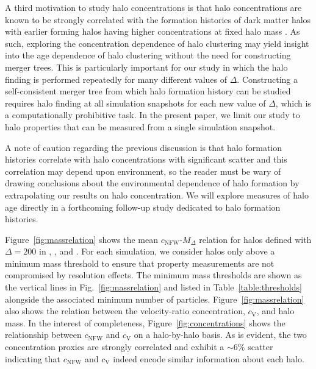 \documentclass[usenatbib,fleqn]{mnras}
\begin{document}
A third motivation to study halo concentrations is that halo concentrations are known to be strongly correlated with the formation histories of dark matter halos with earlier forming halos having higher concentrations at fixed halo mass \citep{wechsler_etal02, zhao_etal03, wechsler_etal06, zhao_etal09}. 
As such, exploring the concentration dependence of halo clustering may yield insight into the age dependence of halo clustering without the need for constructing merger
trees. This is particularly important for our study in which the halo finding is performed repeatedly for many different values of $\Delta$. Constructing a self-consistent merger tree from which halo formation history can be 
studied requires halo finding at all simulation snapshots for each new value of $\Delta$, which is a computationally prohibitive task. In the present paper, we limit our study to halo properties that can be measured from a single simulation 
snapshot. 

A note of caution regarding the previous discussion is that halo formation histories correlate with halo concentrations with significant scatter and this correlation may 
depend upon environment, so the reader must be wary of drawing conclusions about the environmental dependence of halo formation by extrapolating our results on halo concentration. We will explore measures of halo age directly in a forthcoming follow-up study dedicated to halo formation histories.

Figure~\ref{fig:massrelation} shows the mean $c_{\mathrm{NFW}}$-$M_{\Delta}$ relation for halos defined with $\Delta=200$ in \simA, \simB, and \simC. For each simulation, we consider halos only above a minimum mass threshold to ensure that property measurements are not compromised by resolution effects. The minimum mass thresholds are shown as the vertical lines in Fig.~\ref{fig:massrelation} and listed in Table~\ref{table:thresholds} alongside the associated minimum number of particles. Figure~\ref{fig:massrelation} also shows the relation between the velocity-ratio concentration, $c_{\mathrm{V}}$, and halo mass. 
In the interest of completeness, Figure~\ref{fig:concentrations} shows the relationship 
between $c_{\mathrm{NFW}}$ and $c_{\mathrm{V}}$ on a halo-by-halo basis. As is evident, 
the two concentration proxies are strongly correlated and exhibit a $\sim 6\%$ scatter indicating that $c_{\mathrm{NFW}}$ and $c_{\mathrm{V}}$ indeed encode similar information about each halo.
\end{document}

